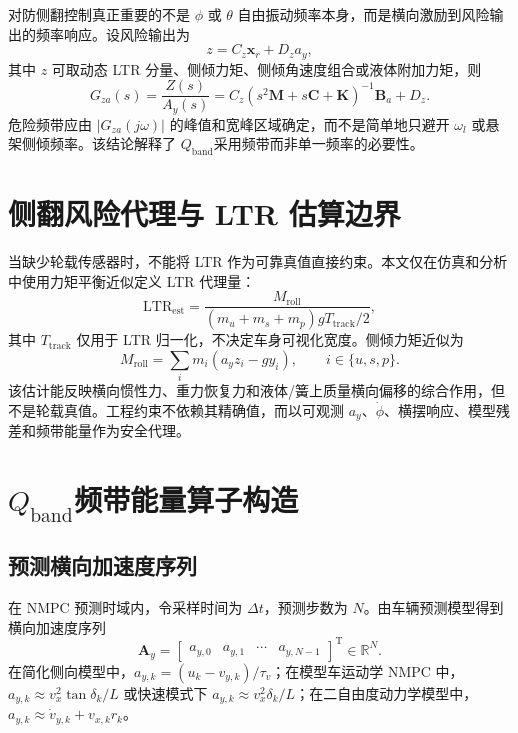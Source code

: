 \documentclass[UTF8,zihao=-4]{ctexrep}
\newcommand{\Qband}{$Q_{\mathrm{band}}$}
\newcommand{\ay}{a_y}
\newcommand{\LTR}{\mathrm{LTR}}
\newcommand{\T}{\mathrm{T}}
\newcommand{\R}{\mathbb{R}}
\begin{document}
对防侧翻控制真正重要的不是 $\phi$ 或 $\theta$ 自由振动频率本身，而是横向激励到风险输出的频率响应。设风险输出为
\begin{equation}
    z=C_z\bm x_r+D_z\ay,
\end{equation}
其中 $z$ 可取动态 LTR 分量、侧倾力矩、侧倾角速度组合或液体附加力矩，则
\begin{equation}
    G_{za}(s)=\frac{Z(s)}{A_y(s)}=C_z(s^2\bm M+s\bm C+\bm K)^{-1}\bm B_a+D_z.
\end{equation}
危险频带应由 $|G_{za}(j\omega)|$ 的峰值和宽峰区域确定，而不是简单地只避开 $\omega_l$ 或悬架侧倾频率。该结论解释了 \Qband 采用频带而非单一频率的必要性。

\section{侧翻风险代理与 LTR 估算边界}
当缺少轮载传感器时，不能将 LTR 作为可靠真值直接约束。本文仅在仿真和分析中使用力矩平衡近似定义 LTR 代理量：
\begin{equation}
    \LTR_{\mathrm{est}}=\frac{M_{\mathrm{roll}}}{(m_u+m_s+m_p)gT_{\mathrm{track}}/2},
    \label{eq:ltr_est}
\end{equation}
其中 $T_{\mathrm{track}}$ 仅用于 LTR 归一化，不决定车身可视化宽度。侧倾力矩近似为
\begin{equation}
    M_{\mathrm{roll}}=\sum_i m_i(\ay z_i-gy_i),\qquad i\in\{u,s,p\}.
\end{equation}
该估计能反映横向惯性力、重力恢复力和液体/簧上质量横向偏移的综合作用，但不是轮载真值。工程约束不依赖其精确值，而以可观测 $\ay$、$\dot\phi$、横摆响应、模型残差和频带能量作为安全代理。

\section{\Qband 频带能量算子构造}
\subsection{预测横向加速度序列}
在 NMPC 预测时域内，令采样时间为 $\Delta t$，预测步数为 $N$。由车辆预测模型得到横向加速度序列
\begin{equation}
    \bm A_y=\begin{bmatrix}a_{y,0}&a_{y,1}&\cdots&a_{y,N-1}\end{bmatrix}^{\T}\in\R^N.
\end{equation}
在简化侧向模型中，$a_{y,k}=(u_k-v_{y,k})/\tau_v$；在模型车运动学 NMPC 中，$a_{y,k}\approx v_x^2\tan\delta_k/L$ 或快速模式下 $a_{y,k}\approx v_x^2\delta_k/L$；在二自由度动力学模型中，$a_{y,k}\approx \dot v_{y,k}+v_{x,k}r_k$。
\end{document}
